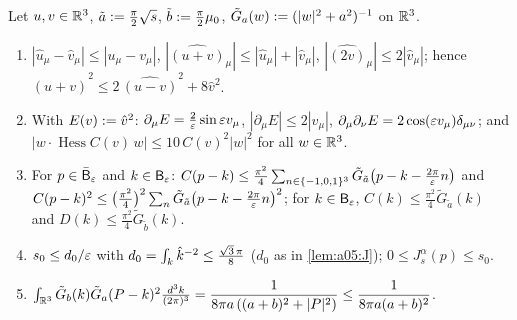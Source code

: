 \begin{lemma}\label{lem:a05:el2}
Let $u,v\in\mathbb R^3$, $\tilde a:=\frac\pi2\sqrt s$, $\tilde b:=\frac\pi2\mu_0$, $\tilde G_a(w):=(|w|^2+a^2)^{-1}$ on $\mathbb R^3$.
\begin{enumerate}[label=\textup{(\alph*)},nosep,leftmargin=*]
\item $|\hat u_\mu-\hat v_\mu|\le|u_\mu-v_\mu|$, $|\widehat{(u+v)}_\mu|\le|\hat u_\mu|+|\hat v_\mu|$, $|\widehat{(2v)}_\mu|\le2|\hat v_\mu|$; hence $\widehat{(u+v)}^2\le2\,\widehat{(u-v)}^2+8\hat v^2$.
\item With $E(v):=\hat v^2$: $\partial_\mu E=\frac2{\varepsilon}\sin\varepsilon v_\mu$, $|\partial_\mu E|\le2|\hat v_\mu|$, $\partial_\mu\partial_\nu E=2\cos(\varepsilon v_\mu)\delta_{\mu\nu}$; and $|w\cdot\operatorname{Hess}C(v)\,w|\le10\,C(v)^2|w|^2$ for all $w\in\mathbb R^3$.
\item For $p\in\bar{\mathsf B}_{\varepsilon}$ and $k\in\mathsf B_{\varepsilon}$: $C(p-k)\le\frac{\pi^2}4\sum_{n\in\{-1,0,1\}^3}\tilde G_{\tilde a}\big(p-k-\tfrac{2\pi}{\varepsilon} n\big)$ and $C(p-k)^2\le\big(\frac{\pi^2}4\big)^2\sum_n\tilde G_{\tilde a}\big(p-k-\tfrac{2\pi}{\varepsilon} n\big)^2$; for $k\in\mathsf B_{\varepsilon}$, $C(k)\le\frac{\pi^2}4\tilde G_{\tilde a}(k)$ and $D(k)\le\frac{\pi^2}4\tilde G_{\tilde b}(k)$.
\item $s_0\le d_0/\varepsilon$ with $d_0=\int_{k}\hat k^{-2}\le\frac{\sqrt3\,\pi}8$ ($d_0$ as in \cref{lem:a05:J}); $0\le J^\alpha_s(p)\le s_0$.
\item $\int_{\mathbb R^3}\tilde G_b(k)\tilde G_a(P-k)^2\frac{d^3k}{(2\pi)^3}=\dfrac1{8\pi a\,((a+b)^2+|P|^2)}\le\dfrac1{8\pi a(a+b)^2}$.
\end{enumerate}
\end{lemma}
